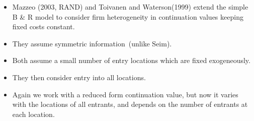 \documentclass[notes=show]{beamer}
\begin{document}
\begin{frame}%


\begin{itemize}
\item Mazzeo (2003, RAND) and Toivanen and Waterson(1999) extend the simple
B \& R model to consider firm heterogeneity in continuation values keeping
fixed costs constant.

\item They assume symmetric information\ (unlike Seim).

\item Both assume a small number of entry locations which are fixed
exogeneously.

\item They then consider entry into all locations.

\item Again we work with a reduced form continuation value, but now it
varies with the locations of all entrants, and depends on the number of
entrants at each location.
\end{itemize}

\end{frame}%
\end{document}
